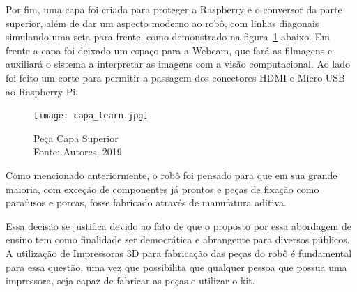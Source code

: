 Por fim, uma capa foi criada para proteger a Raspberry e o conversor da parte superior, além de dar um aspecto moderno ao robô, com linhas diagonais simulando uma seta para frente, como demonstrado na figura~\ref{fig:capa_learn} abaixo. Em frente a capa foi deixado um espaço para a Webcam, que fará as filmagens e auxiliará o sistema a interpretar as imagens com a visão computacional. Ao lado foi feito um corte para permitir a passagem dos conectores HDMI e Micro USB ao Raspberry Pi.

\begin{figure}[h!]
	\centering
	\texttt{[image: capa\_learn.jpg]}\\
	\caption{Peça Capa Superior \\ Fonte: Autores, 2019}
	\label{fig:capa_learn}
\end{figure}

Como mencionado anteriormente, o robô foi pensado para que em sua grande maioria, com exceção de componentes já prontos e peças de fixação como parafusos e porcas, fosse fabricado através de manufatura aditiva.

Essa decisão se justifica devido ao fato de que o proposto por essa abordagem de ensino tem como finalidade ser democrática e abrangente para diversos públicos. A utilização de Impressoras 3D para fabricação das peças do robô é fundamental para essa questão, uma vez que possibilita que qualquer pessoa que possua uma impressora, seja capaz de fabricar as peças e utilizar o kit.

